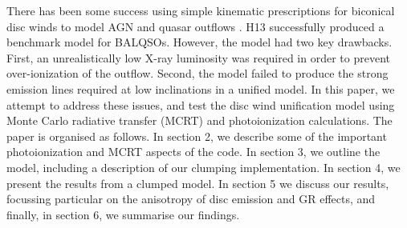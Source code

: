 \documentclass[useAMS,usenatbib]{mn2e_x}
\begin{document}
There has been some success using simple
kinematic prescriptions for biconical disc winds to model 
AGN and quasar outflows \citep[][hereafter H13]{simlong2008,sim2010,higginbottom2013}. 
H13 successfully produced a benchmark model for BALQSOs. However, the model
had two key drawbacks. First, an unrealistically low X-ray luminosity
was required in order to prevent over-ionization of the outflow.
Second, the model failed to produce the strong emission lines 
required at low inclinations in a unified model.
In this paper, we attempt to address these issues, and test the disc wind 
unification model using Monte Carlo radiative transfer (MCRT) and photoionization 
calculations. The paper is organised as follows.
In section 2, we describe some of the important photoionization 
and MCRT aspects of the code. In section 3, we outline the model, including 
a description of our clumping implementation. In section 4, we present the results 
from a clumped model. In section 5 we discuss our results, 
focussing particular on the anisotropy of 
disc emission and GR effects, and finally, in section 6, we summarise our findings.






\end{document}
